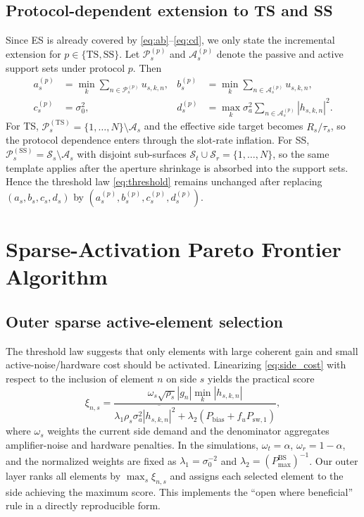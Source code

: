 \documentclass[journal]{IEEEtran}
\begin{document}
\subsection{Protocol-dependent extension to TS and SS}
Since ES is already covered by \eqref{eq:ab}--\eqref{eq:cd}, we only state the incremental extension for $p\in\{\mathrm{TS},\mathrm{SS}\}$. Let $\mathcal{P}_s^{(p)}$ and $\mathcal{A}_s^{(p)}$ denote the passive and active support sets under protocol $p$. Then
\begin{align*}
a_s^{(p)} &= \min_k \sum_{n\in\mathcal{P}_s^{(p)}} u_{s,k,n}, &
 b_s^{(p)} &= \min_k \sum_{n\in\mathcal{A}_s^{(p)}} u_{s,k,n},\\
c_s^{(p)} &= \sigma_0^2, &
d_s^{(p)} &= \max_k \sigma_a^2 \sum_{n\in\mathcal{A}_s^{(p)}} |h_{s,k,n}|^2.
\end{align*}
For TS, $\mathcal{P}_s^{(\mathrm{TS})}=\{1,\ldots,N\}\setminus\mathcal{A}_s$ and the effective side target becomes $R_s/\tau_s$, so the protocol dependence enters through the slot-rate inflation. For SS, $\mathcal{P}_s^{(\mathrm{SS})}=\mathcal{S}_s\setminus\mathcal{A}_s$ with disjoint sub-surfaces $\mathcal{S}_t\cup\mathcal{S}_r=\{1,\ldots,N\}$, so the same template applies after the aperture shrinkage is absorbed into the support sets. Hence the threshold law \eqref{eq:threshold} remains unchanged after replacing $(a_s,b_s,c_s,d_s)$ by $(a_s^{(p)},b_s^{(p)},c_s^{(p)},d_s^{(p)})$.

\section{Sparse-Activation Pareto Frontier Algorithm}
\subsection{Outer sparse active-element selection}
The threshold law suggests that only elements with large coherent gain and small active-noise/hardware cost should be activated. Linearizing \eqref{eq:side_cost} with respect to the inclusion of element $n$ on side $s$ yields the practical score
\begin{equation}
\xi_{n,s}=
\frac{\omega_s\sqrt{\rho_s}|g_n|\min_k|h_{s,k,n}|}
{\lambda_1\rho_s\sigma_a^2\overline{|h_{s,k,n}|^2}
+\lambda_2(P_{\mathrm{bias}}+f_uP_{\mathrm{sw},1})},
\label{eq:score}
\end{equation}
where $\omega_s$ weights the current side demand and the denominator aggregates amplifier-noise and hardware penalties. In the simulations, $\omega_t=\alpha$, $\omega_r=1-\alpha$, and the normalized weights are fixed as $\lambda_1=\sigma_0^{-2}$ and $\lambda_2=(P_{\max}^{\mathrm{BS}})^{-1}$. Our outer layer ranks all elements by $\max_s\xi_{n,s}$ and assigns each selected element to the side achieving the maximum score. This implements the ``open where beneficial'' rule in a directly reproducible form.
\end{document}

